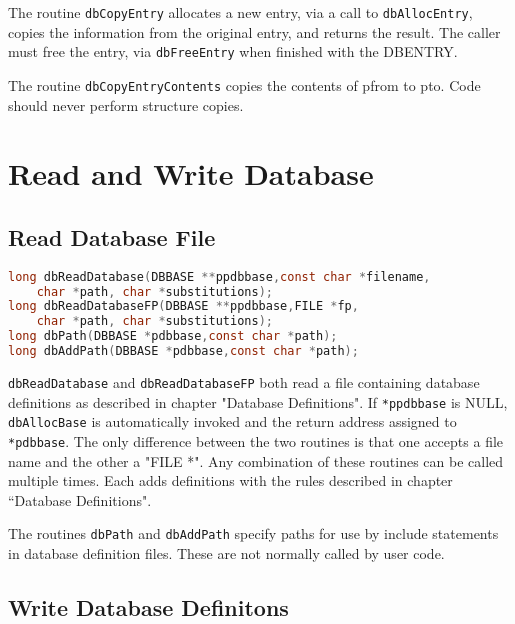The routine \verb|dbCopyEntry| allocates a new entry, via a call to \verb|dbAllocEntry|, copies the information from the original 
entry, and returns the result. The caller must free the entry, via \verb|dbFreeEntry| when finished with the DBENTRY.

The routine \verb|dbCopyEntryContents| copies the contents of pfrom to pto. Code should never perform structure copies.

\section{Read and Write Database}

\subsection{Read Database File}

\begin{lstlisting}[language=C]
long dbReadDatabase(DBBASE **ppdbbase,const char *filename,
    char *path, char *substitutions);
long dbReadDatabaseFP(DBBASE **ppdbbase,FILE *fp,
    char *path, char *substitutions);
long dbPath(DBBASE *pdbbase,const char *path);
long dbAddPath(DBBASE *pdbbase,const char *path);
\end{lstlisting}

\verb|dbReadDatabase| and \verb|dbReadDatabaseFP| both read a file containing database definitions as described in chapter 
"Database Definitions". If \verb|*ppdbbase| is NULL, \verb|dbAllocBase| is automatically invoked and the return address 
assigned to \verb|*pdbbase|. The only difference between the two routines is that one accepts a file name and the other a 
"FILE *". Any combination of these routines can be called multiple times. Each adds definitions with the rules described 
in chapter ``Database Definitions".

The routines \verb|dbPath| and \verb|dbAddPath| specify paths for use by include statements in database definition files. These are 
not normally called by user code.

\subsection{Write Database Definitons}

